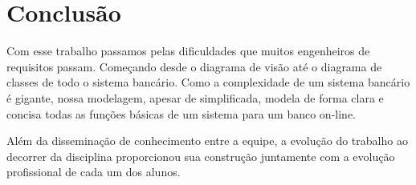 \chapter[Conclusão]{Conclusão}
Com esse trabalho passamos pelas dificuldades que muitos engenheiros de requisitos passam. Começando desde o diagrama de visão até o diagrama de classes de todo o sistema bancário.
Como a complexidade de um sistema bancário é gigante, nossa modelagem, apesar de simplificada, modela de forma clara e concisa todas as funções básicas de um sistema para um banco on-line.

Além da disseminação de conhecimento entre a equipe, a evolução do trabalho ao decorrer da disciplina proporcionou sua construção juntamente com a evolução profissional de cada um dos alunos.
